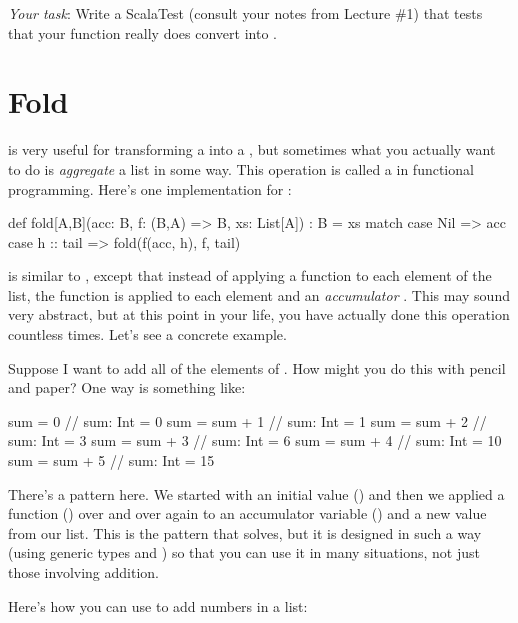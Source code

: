 \documentclass{book}
\begin{document}
\emph{Your task}: Write a ScalaTest (consult your notes from Lecture \#1) that tests that your function really does convert  into .

\section{Fold}

 is very useful for transforming a  into a , but sometimes what you actually want to do is \emph{aggregate} a list in some way.  This operation is called a  in functional programming.  Here's one implementation for :

\begin{scalacode}
def fold[A,B](acc: B, f: (B,A) => B, xs: List[A]) : B = {
  xs match {
    case Nil => acc
    case h :: tail => fold(f(acc, h), f, tail)
  }
}
\end{scalacode}

 is similar to , except that instead of applying a function to each element of the list, the function  is applied to each element and an \emph{accumulator} .  This may sound very abstract, but at this point in your life, you have actually done this operation countless times.  Let's see a concrete example.

Suppose I want to add all of the elements of .  How might you do this with pencil and paper?  One way is something like:

\begin{scalacode}
sum = 0
// sum: Int = 0
sum = sum + 1
// sum: Int = 1
sum = sum + 2
// sum: Int = 3
sum = sum + 3
// sum: Int = 6
sum = sum + 4
// sum: Int = 10
sum = sum + 5
// sum: Int = 15
\end{scalacode}

There's a pattern here.  We started with an initial value () and then we applied a function (\scalainline{+}) over and over again to an accumulator variable () and a new value from our list.  This is the pattern that  solves, but it is designed in such a way (using generic types  and ) so that you can use it in many situations, not just those involving addition.

Here's how you can use  to add numbers in a list:
\end{document}
